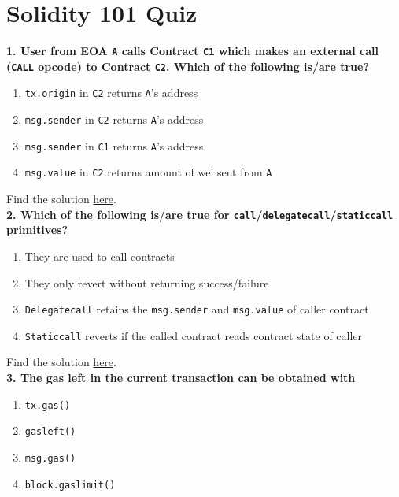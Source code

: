 \section{Solidity 101 Quiz}

\textbf{1. User from EOA \texttt{A} calls Contract \texttt{C1} which makes an external call (\texttt{CALL} opcode) to Contract \texttt{C2}.
Which of the following is/are true?}

\begin{enumerate}[label=\Alph*.]
    \item\verb|tx.origin| in \verb|C2| returns \verb|A|'s address
    \item\verb|msg.sender| in \verb|C2| returns \verb|A|'s address
    \item\verb|msg.sender| in \verb|C1| returns \verb|A|'s address
    \item\verb|msg.value| in \verb|C2| returns amount of wei sent from \verb|A|
\end{enumerate}

Find the solution \hyperref[sec:exam2_q1]{here}.\\

\textbf{2. Which of the following is/are true for \texttt{call}/\texttt{delegatecall}/\texttt{staticcall} primitives?}

\begin{enumerate}[label=\Alph*.]
    \item They are used to call contracts
    \item They only revert without returning success/failure
    \item\verb|Delegatecall| retains the \verb|msg.sender| and \verb|msg.value| of caller contract
    \item\verb|Staticcall| reverts if the called contract reads contract state of caller
\end{enumerate}

Find the solution \hyperref[sec:exam2_q2]{here}.\\

\textbf{3. The gas left in the current transaction can be obtained with}

\begin{enumerate}[label=\Alph*.]
    \item\verb|tx.gas()|
    \item\verb|gasleft()|
    \item\verb|msg.gas()|
    \item\verb|block.gaslimit()|
\end{enumerate}

